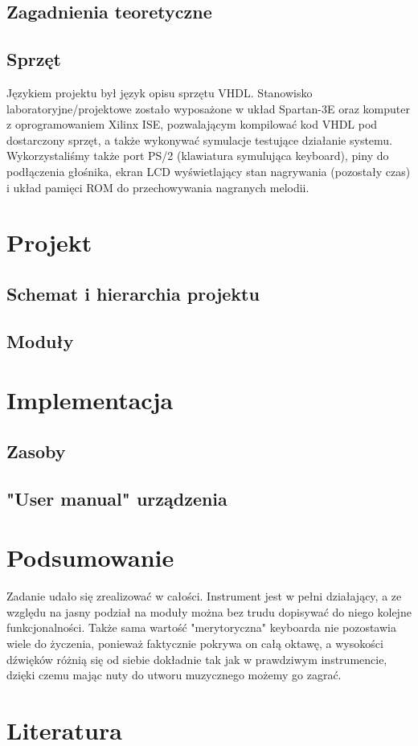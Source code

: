 \documentclass[a4paper,11pt]{article}
\begin{document}
\subsection{Zagadnienia teoretyczne}

\subsection{Sprzęt}
Językiem projektu był język opisu sprzętu VHDL. Stanowisko laboratoryjne/projektowe zostało wyposażone w układ Spartan-3E oraz komputer z oprogramowaniem Xilinx ISE, pozwalającym kompilować kod VHDL pod dostarczony sprzęt, a także wykonywać symulacje testujące działanie systemu. Wykorzystaliśmy także port PS/2 (klawiatura symulująca keyboard), piny do podłączenia głośnika, ekran LCD wyświetlający stan nagrywania (pozostały czas) i układ pamięci ROM do przechowywania nagranych melodii.

\section{Projekt}
\subsection{Schemat i hierarchia projektu}
\subsection{Moduły}

\section{Implementacja}
\subsection{Zasoby}
\subsection{"User manual" urządzenia}

\section{Podsumowanie}
Zadanie udało się zrealizować w całości. Instrument jest w pełni działający, a ze względu na jasny podział na moduły można bez trudu dopisywać do niego kolejne funkcjonalności. Także sama wartość "merytoryczna" keyboarda nie pozostawia wiele do życzenia, ponieważ faktycznie pokrywa on całą oktawę, a wysokości dźwięków różnią się od siebie dokładnie tak jak w prawdziwym instrumencie, dzięki czemu mając nuty do utworu muzycznego możemy go zagrać.

\section{Literatura}
\end{document}
